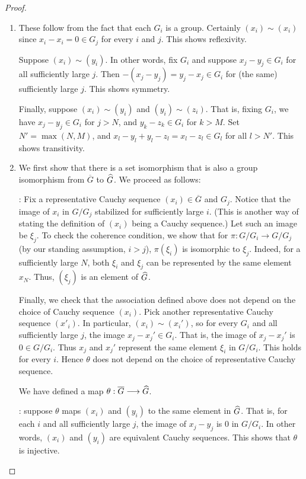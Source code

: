 \begin{proof}
\begin{enumerate}
\item These follow from the fact that each $G_i$ is a group. 
Certainly $(x_i) \sim (x_i)$ since $x_i - x_i = 0 \in G_j$ for 
every $i$ and $j$. This shows reflexivity.

Suppose $(x_i) \sim (y_i)$. In other words, fix $G_i$ and suppose 
$x_j - y_j \in G_i$ for all sufficiently large $j$. Then 
$-(x_j - y_j) = y_j - x_j \in G_i$ for (the same) sufficiently 
large $j$. This shows symmetry.

Finally, suppose $(x_i) \sim (y_i)$ and $(y_i) \sim (z_i)$.
That is, fixing $G_i$, we have $x_j - y_j \in G_i$ for $j > N$,
and $y_k - z_k \in G_i$ for $k > M$. Set $N' = \max(N, M)$,
and $x_l - y_l + y_l - z_l = x_l - z_l \in G_l$ for all $l > N'$.
This shows transitivity.

\item We first show that there is a set isomorphism that is also 
a group isomorphism from $\overline{G}$ to $\widehat{G}$. 
We proceed as follows:

 :
Fix a representative Cauchy sequence $(x_i) \in \overline{G}$ and 
$G_j$. Notice that the image of $x_i$ in $G/G_j$ stabilized for 
sufficiently large $i$. (This is another way of stating the 
definition of $(x_i)$ being a Cauchy sequence.) Let such an image 
be $\xi_j$. To check the coherence condition, we show that for 
$\pi: G/G_i \to G/G_j$ (by our standing assumption, $i > j$), 
$\pi(\xi_i)$ is isomorphic to $\xi_j$. Indeed, for a sufficiently 
large $N$, both $\xi_i$ and $\xi_j$ can be represented by the same 
element $x_N$. Thus, $(\xi_j)$ is an element of $\widehat{G}$.

Finally, we check that the association defined above does not 
depend on the choice of Cauchy sequence $(x_i)$. Pick another 
representative Cauchy sequence $(x'_i)$. In particular, $(x_i) 
\sim (x_i')$, so for every $G_i$ and all sufficiently large $j$, 
the image $x_j - x_j' \in G_i$. That is, the image of $x_j - x_j'$ 
is $0 \in G/G_i$. Thus $x_j$ and $x_j'$ represent the same element 
$\xi_i$ in $G/G_i$. This holds for every $i$. Hence $\theta$ does 
not depend on the choice of representative Cauchy sequence.

We have defined a map $\theta : \overline{G} \longrightarrow \widehat{G}$.

 : suppose $\theta$ maps $(x_i)$ and 
$(y_i)$ to the same element in $\widehat{G}$. That is, for each
$i$ and all sufficiently large $j$, the image of $x_j - y_j$ is 
$0$ in $G/G_i$. In other words, $(x_i)$ and $(y_i)$ are equivalent
Cauchy sequences. This shows that $\theta$ is injective.


\end{enumerate}
\end{proof}
